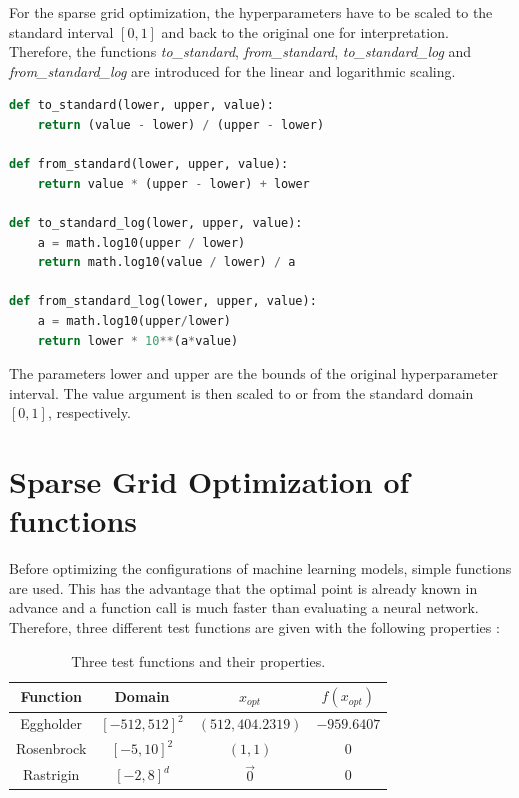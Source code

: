For the sparse grid optimization, the hyperparameters have to be scaled to the standard interval $ [0,1] $ and back to the original one for interpretation. Therefore, the functions \textit{to\_standard}, \textit{from\_standard}, \textit{to\_standard\_log} and \textit{from\_standard\_log} are introduced for the linear and logarithmic scaling. 

\begin{lstlisting}[language=Python]
def to_standard(lower, upper, value):
	return (value - lower) / (upper - lower)
	
def from_standard(lower, upper, value):
	return value * (upper - lower) + lower
	
def to_standard_log(lower, upper, value):
	a = math.log10(upper / lower)
	return math.log10(value / lower) / a	
	
def from_standard_log(lower, upper, value):
	a = math.log10(upper/lower)
	return lower * 10**(a*value)
\end{lstlisting}

The parameters lower and upper are the bounds of the original hyperparameter interval. The value argument is then scaled to or from the standard domain $ [0,1] $, respectively.


\section{Sparse Grid Optimization of functions}

Before optimizing the configurations of machine learning models, simple functions are used. This has the advantage that the optimal point is already known in advance and a function call is much faster than evaluating a neural network. Therefore, three different test functions are given with the following properties \cite{valentin2016hierarchical}:

\begin{table}[htbp!]
	\caption{ Three test functions and their properties.}
	\label{tab:test_functions}
	\centering
	\begin{tabular}{|c c c c|} 
		\hline
		Function & Domain & $x_{opt}$ & $ f(x_{opt}) $\\
		\hline
		Eggholder & $[-512, 512]^2 $ & $(512, 404.2319)$ & $ -959.6407 $ \\
		Rosenbrock & $[-5, 10]^2 $ & $(1,1)$ & $ 0 $ \\
		Rastrigin & $[-2, 8]^d $ & $\vec{0}$ & $ 0 $ \\
		\hline
	\end{tabular}
\end{table}

